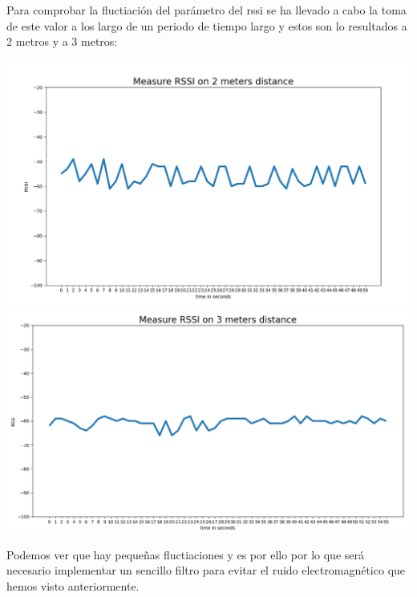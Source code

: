 \documentclass[a4paper ,12pt, onecolumn]{article}
\begin{document}
                Para comprobar la fluctiación del parámetro del rssi se ha llevado a cabo la toma de este valor a los largo de un 
                periodo de tiempo largo y estos son lo resultados a 2 metros y a 3 metros:
                \begin{center}
                    \includegraphics[scale=0.35]{1_beacon_2_meters.PNG}
                    \includegraphics[scale=0.3]{1_beacon_3_meters.PNG}
                \end{center}
                Podemos ver que hay pequeñas fluctiaciones y es por ello por lo que será necesario implementar un sencillo filtro para
                evitar el ruido electromagnético que hemos visto anteriormente.
\end{document}
